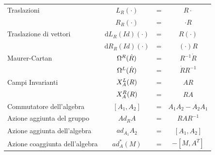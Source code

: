 \documentclass[11pt]{report}
\theoremstyle{plain}
\theoremstyle{definition}
\theoremstyle{remark}
\begin{document}
\begin{center}
\begin{tabular}{|l|c c c|} 
 \hline
 Traslazioni & $L_{R}(\cdot)$ & = & $R \cdot$ \\
 &  $R_{R}(\cdot)$ & = & $\cdot R$ \\
 \hline
 Traslazione di vettori & $\textrm{d}L_{R}(Id)(\cdot)$ & = & $R (\cdot)$ \\
			& $\textrm{d}R_{R}(Id)(\cdot)$ & = & $(\cdot) R$ \\
\hline
Maurer-Cartan & $\Omega^{\footnotesize{R}}(\dot{R})$ & = & $R^{-1}\dot{R}$ \\
			& $\Omega^{\footnotesize{L}}(\dot{R})$ & = & $\dot{R}R^{-1}$\\			
\hline
Campi Invarianti 			& $X_{A}^{\footnotesize{L}}(R)$ & = & $A R$ \\
							& $X_{A}^{\footnotesize{R}}(R)$ & = & $R A$ \\
\hline
Commutatore dell'algebra 	& $[A_{1},A_{2}]$ & = &$ A_{1}A_{2} - A_{2}A_{1} $\\
\hline
Azione aggiunta del gruppo &$ Ad_{R}A $& = & $R A R^{-1} $\\
Azione aggiunta dell'algebra & $ ad_{A_{1}} A_{2} $ & = & $  [A_{1},A_{2}] $\\
Azione coaggiunta dell'algebra &$ ad_{A}^{\ast} (M) $ & = & $  - [M,A^{T} ] $\\
\hline
\end{tabular} 
\end{center} 
		
\end{document}
